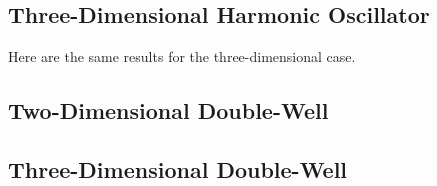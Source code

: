     

\subsection{Three-Dimensional Harmonic Oscillator}
    Here are the same results for the three-dimensional case.
    
    
    

\subsection{Two-Dimensional Double-Well}
    

\subsection{Three-Dimensional Double-Well}
    
